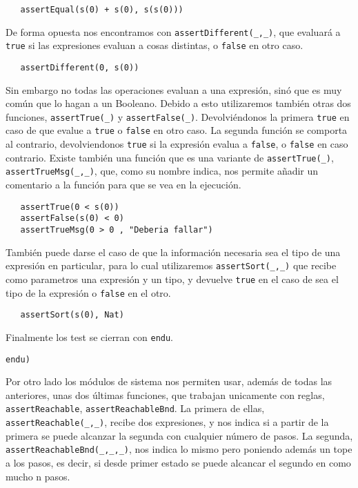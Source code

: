 {\codesize
\begin{verbatim}
   assertEqual(s(0) + s(0), s(s(0)))
\end{verbatim}
}

De forma opuesta nos encontramos con \verb"assertDifferent(_,_)", que evaluará a \texttt{true} si las expresiones evaluan a cosas distintas, o \texttt{false} en otro caso. \par

{\codesize
\begin{verbatim}
   assertDifferent(0, s(0))
\end{verbatim}
}

Sin embargo no todas las operaciones evaluan a una expresión, sinó que es muy común que lo hagan a un Booleano. Debido a esto utilizaremos también otras dos funciones, \verb"assertTrue(_)" y \verb"assertFalse(_)". Devolviéndonos la primera \texttt{true} en caso de que evalue a \texttt{true} o \texttt{false} en otro caso. La segunda función se comporta al contrario, devolviendonos \texttt{true} si la expresión evalua a \texttt{false}, o \texttt{false} en caso contrario. Existe también una función que es una variante de \verb"assertTrue(_)", \verb"assertTrueMsg(_,_)", que, como su nombre indica, nos permite añadir un comentario a la función para que se vea en la ejecución. \par

{\codesize
\begin{verbatim}
   assertTrue(0 < s(0))
   assertFalse(s(0) < 0)
   assertTrueMsg(0 > 0 , "Deberia fallar")
\end{verbatim}
}

También puede darse el caso de que la información necesaria sea el tipo de una expresión en particular, para lo cual utilizaremos \verb"assertSort(_,_)" que recibe como parametros una expresión y un tipo, y devuelve \texttt{true} en el caso de sea el tipo de la expresión o \texttt{false} en el otro.\par

{\codesize
\begin{verbatim}
   assertSort(s(0), Nat)
\end{verbatim}
} 

Finalmente los test se cierran con \texttt{endu}. \par

{\codesize
\begin{verbatim}
endu)
\end{verbatim}
}

Por otro lado los módulos de sistema nos permiten usar, además de todas las anteriores, unas dos últimas funciones, que trabajan unicamente con reglas, \verb"assertReachable", \verb"assertReachableBnd". La primera de ellas,\\ \verb"assertReachable(_,_)", recibe dos expresiones, y nos indica si a partir de la primera se puede alcanzar la segunda con cualquier número de pasos. La segunda, \verb"assertReachableBnd(_,_,_)", nos indica lo mismo pero poniendo además un tope a los pasos, es decir, si desde primer estado se puede alcancar el segundo en como mucho n pasos. \par

